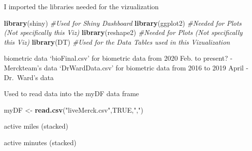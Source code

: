 \documentclass[]{book}
\newenvironment{Shaded}{\begin{snugshade}}{\end{snugshade}}
\newcommand{\KeywordTok}[1]{\textcolor[rgb]{0.13,0.29,0.53}{\textbf{#1}}}
\newcommand{\DataTypeTok}[1]{\textcolor[rgb]{0.13,0.29,0.53}{#1}}
\newcommand{\StringTok}[1]{\textcolor[rgb]{0.31,0.60,0.02}{#1}}
\newcommand{\CommentTok}[1]{\textcolor[rgb]{0.56,0.35,0.01}{\textit{#1}}}
\newcommand{\OtherTok}[1]{\textcolor[rgb]{0.56,0.35,0.01}{#1}}
\newcommand{\OperatorTok}[1]{\textcolor[rgb]{0.81,0.36,0.00}{\textbf{#1}}}
\newcommand{\NormalTok}[1]{#1}
\begin{document}
I imported the libraries needed for the vizualization

\begin{Shaded}
\begin{Highlighting}[]
\KeywordTok{library}\NormalTok{(shiny) }\CommentTok{#Used for Shiny Dashboard}
\KeywordTok{library}\NormalTok{(ggplot2) }\CommentTok{#Needed for Plots (Not specifically this Viz)}
\KeywordTok{library}\NormalTok{(reshape2) }\CommentTok{#Needed for Plots (Not specifically this Viz)}
\KeywordTok{library}\NormalTok{(DT) }\CommentTok{#Used for the Data Tables used in this Vizualization}
\end{Highlighting}
\end{Shaded}

biometric data `bioFinal.csv' for biometric data from 2020 Feb. to
present? - Merckteam's data `DrWardData.csv' for biometric data from
2016 to 2019 April - Dr.~Ward's data

Used to read data into the myDF data frame

\begin{Shaded}
\begin{Highlighting}[]
\NormalTok{myDF <-}\StringTok{ }\KeywordTok{read.csv}\NormalTok{(}\StringTok{"liveMerck.csv"}\NormalTok{,}\OtherTok{TRUE}\NormalTok{,}\StringTok{","}\NormalTok{)}
\end{Highlighting}
\end{Shaded}

active miles (stacked)

\begin{Shaded}
\end{Shaded}

active minutes (stacked)

\begin{Shaded}
\end{Shaded}
\end{document}
